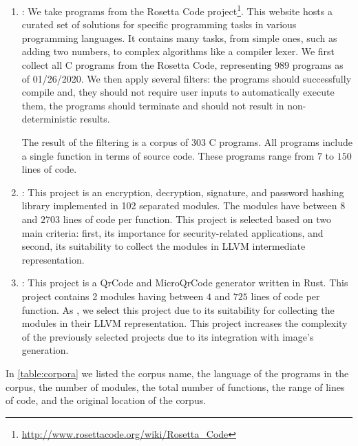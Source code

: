 \begin{enumerate}
    \item \textbf{\corpusrosetta}: We take programs from the Rosetta Code project\footnote{\url{http://www.rosettacode.org/wiki/Rosetta_Code}}. This website hosts a curated set of solutions for specific programming tasks in various programming languages. It contains many tasks, from simple ones, such as adding two numbers, to complex algorithms like a compiler lexer. We first collect all C programs from the Rosetta Code, representing $989$ programs as of 01/26/2020. We then apply several filters: the programs should successfully compile and, they should not require user inputs to automatically execute them, the programs should terminate and should not result in non-deterministic results. 
    
    The result of the filtering is a corpus of 303 C programs. All programs include a single function in terms of source code. These programs range from $7$ to $150$ lines of code.

    \item \textbf{\corpussodium}: This project is an encryption, decryption, signature, and password hashing library implemented in 102 separated modules. The modules have between $8$ and $2703$ lines of code per function. This project is selected based on two main criteria: first, its importance for security-related applications, and second, its suitability to collect the modules in LLVM intermediate representation. %

    \item \textbf{\corpusqrcode}: This project is a QrCode and MicroQrCode generator written in Rust. This project contains 2 modules having between $4$ and $725$ lines of code per function. As \corpussodium, we select this project due to its suitability for collecting the modules in their LLVM representation. This project increases the complexity of the previously selected projects due to its integration with image's generation.
    
\end{enumerate}

In \autoref{table:corpora} we listed the corpus name, the language of the programs in the corpus, the number of modules, the total number of functions, the range of lines of code, and the original location of the corpus. 



